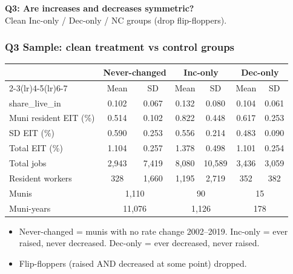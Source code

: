 \documentclass[xcolor = x11names, compress, aspectratio = 169]{beamer}
\renewcommand{\(}{\begin{columns}}
\renewcommand{\)}{\end{columns}}
\newcommand{\<}[1]{\begin{column}{#1}}
\renewcommand{\>}{\end{column}}
\begin{document}
\begin{frame}[plain]
    \centering
    \vfill
    \Large \textbf{Q3: Are increases and decreases symmetric?}
    \normalsize
    \vspace{0.4cm}\\
    Clean Inc-only / Dec-only / NC groups (drop flip-floppers).
    \vfill
\end{frame}

\begin{frame}
\frametitle{Q3 Sample: clean treatment vs control groups}
    \centering
    \small
    \begin{tabular}{lcccccc}
        \toprule
        & \multicolumn{2}{c}{Never-changed} & \multicolumn{2}{c}{Inc-only} & \multicolumn{2}{c}{Dec-only} \\
        \cmidrule(lr){2-3}\cmidrule(lr){4-5}\cmidrule(lr){6-7}
        & Mean & SD & Mean & SD & Mean & SD \\
        \midrule
        share\_live\_in       & 0.102 & 0.067 & 0.132 & 0.080 & 0.104 & 0.061 \\
        Muni resident EIT (\%) & 0.514 & 0.102 & 0.822 & 0.448 & 0.617 & 0.253 \\
        SD EIT (\%)            & 0.590 & 0.253 & 0.556 & 0.214 & 0.483 & 0.090 \\
        Total EIT (\%)         & 1.104 & 0.257 & 1.378 & 0.498 & 1.101 & 0.254 \\
        Total jobs              & 2{,}943 & 7{,}419 & 8{,}080 & 10{,}589 & 3{,}436 & 3{,}059 \\
        Resident workers       & 328     & 1{,}660 & 1{,}195 & 2{,}719  & 352     & 382 \\
        \midrule
        Munis                  & \multicolumn{2}{c}{1{,}110} & \multicolumn{2}{c}{90} & \multicolumn{2}{c}{15} \\
        Muni-years             & \multicolumn{2}{c}{11{,}076} & \multicolumn{2}{c}{1{,}126} & \multicolumn{2}{c}{178} \\
        \bottomrule
    \end{tabular}
    \vspace{0.15cm}
    \begin{itemize}\setlength{\itemsep}{0.04cm}\small
        \item Never-changed = munis with no rate change 2002--2019.
        Inc-only = ever raised, never decreased. Dec-only = ever decreased, never raised.
        \item Flip-floppers (raised AND decreased at some point) dropped.
    \end{itemize}
\end{frame}
\end{document}
